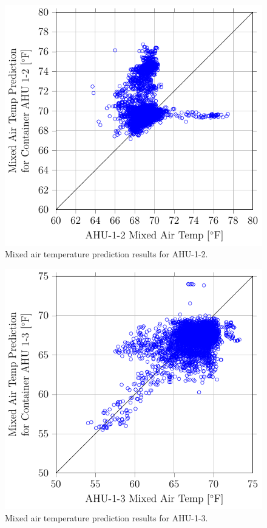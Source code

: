 
\newcommand{\mixAirCaptionTwo}[1]{Mixed air temperature prediction results for #1.}

\begin{figure}
\centering
\includegraphics[]{Plots/2016-09-07-1335-MixedAirTempPredictionforContainerAHU12vsAHU12MixedAirTemp.pdf}
\caption{\mixAirCaptionTwo{AHU-1-2}}
\label{fig:2016-09-07-1335-MixedAirTempPredictionforContainerAHU12vsAHU12MixedAirTemp}
\end{figure}

\begin{figure}
\centering
\includegraphics[]{Plots/2016-09-07-1346-MixedAirTempPredictionforContainerAHU13vsAHU13MixedAirTemp.pdf}
\caption{\mixAirCaptionTwo{AHU-1-3}}
\label{fig:2016-09-07-1346-MixedAirTempPredictionforContainerAHU13vsAHU13MixedAirTemp}
\end{figure}

